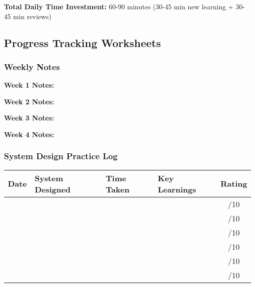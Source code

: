 \documentclass[10pt,a4paper]{article}
\begin{document}
\textbf{Total Daily Time Investment:} 60-90 minutes (30-45 min new learning + 30-45 min reviews)

\subsection{Progress Tracking Worksheets}

\subsubsection{Weekly Notes}

\textbf{Week 1 Notes:}\\

\textbf{Week 2 Notes:}\\

\textbf{Week 3 Notes:}\\

\textbf{Week 4 Notes:}\\

\subsubsection{System Design Practice Log}

\begin{table}[h]
\centering
\begin{tabular}{|p{2cm}|p{4cm}|p{3cm}|p{3cm}|c|}
\hline
\textbf{Date} & \textbf{System Designed} & \textbf{Time Taken} & \textbf{Key Learnings} & \textbf{Rating} \\
\hline
& & & & /10 \\
\hline
& & & & /10 \\
\hline
& & & & /10 \\
\hline
& & & & /10 \\
\hline
& & & & /10 \\
\hline
& & & & /10 \\
\hline
\end{tabular}
\end{table}
\end{document}
